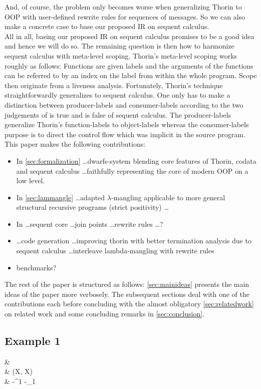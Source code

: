 And, of course, the problem only becomes worse when generalizing Thorin to OOP with user-defined rewrite rules for sequences of messages.
So we can also make a concrete case to base our proposed IR on sequent calculus.
\\
All in all, basing our proposed IR on sequent calculus promises to be a good idea and hence we will do so.
The remaining question is then how to harmonize sequent calculus with meta-level scoping.
Thorin's meta-level scoping works roughly as follows:
Functions are given labels and the arguments of the functions can be referred to by an index on the label from within the whole program.
Scope then originate from a liveness analysis.
Fortunately, Thorin's technique straightforwardly generalizes to sequent calculus.
One only has to make a distinction between producer-labels and consumer-labels according to the two judgements of {\glqq}is true{\grqq} and {\glqq}is false{\grqq} of sequent calculus.
The producer-labels generalize Thorin's function-labels to object-labels whereas the consumer-labels purpose is to direct the control flow which was implicit in the source program.
\\
This paper makes the following contributions:

\begin{itemize}
  \item
    In \cref{sec:formalization} \ldots dwarfs-system blending core features of Thorin, codata and sequent calculus \ldots faithfully representing the core of modern OOP on a low level.
  \item
    In \cref{sec:lammangle} \ldots adapted $\lambda$-mangling applicable to more general structural recursive programs (strict positivity) \ldots
  \item
    In \ldots sequent core \ldots join points \ldots rewrite rules \ldots?
  \item
    \ldots code generation \ldots improving thorin with better termination analysis due to sequent calculus \ldots interleave lambda-mangling with rewrite rules
  \item
    benchmarks?
\end{itemize}

The rest of the paper is structured as follows: \cref{sec:mainideas} presents the main ideas of the paper more verbosely. The subsequent sections deal with one of the contributions each before concluding with the almost obligatory \cref{sec:relatedwork} on related work and some concluding remarks in \cref{sec:conclusion}.

\subsection{Example 1}

\begin{codealign}
  &
    \identity
    \prd
    \FunXX\
    \by
  \\[-3pt]
  &\quad
    \Apply(\prd X, \con X)
    \colon
  \\[-3pt]
  &\quad\quad
    \FunXX\textsc{-}\Apply^{1}
    \mkCmd
    \FunXX\textsc{-}\Apply_{1}
\end{codealign}
